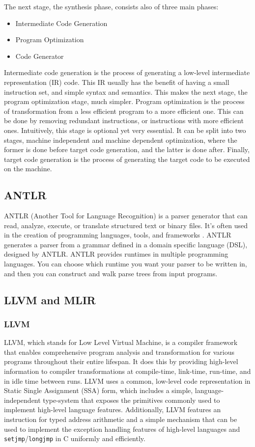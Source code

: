 The next stage, the synthesis phase, consists also of three main phases:
\begin{itemize}
  \item Intermediate Code Generation
  \item Program Optimization
  \item Code Generator
\end{itemize}
Intermediate code generation is the process of generating a low-level
intermediate representation (IR) code. This IR usually has the benefit of having
a small instruction set, and simple syntax and semantics. This makes the next stage, 
the program optimization stage, much simpler.
Program optimization is the process of transformation from a less efficient program 
to a more efficient one. This can be done by removing redundant instructions,
or instructions with more efficient ones. Intuitively, this stage is optional yet
very essential. It can be split into two stages, machine independent and machine
dependent optimization, where the former is done before target code generation,
and the latter is done after.
Finally, target code generation is the process of generating the
target code to be executed on the machine. %
\subsection{ANTLR}
ANTLR (Another Tool for Language Recognition) is a parser generator that can
read, analyze, execute, or translate structured text or binary files. It's often
used in the creation of programming languages, tools, and frameworks
\cite{ANTLR}. ANTLR generates a parser from a grammar defined in a domain
specific language (DSL), designed by ANTLR. ANTLR provides runtimes in multiple
programming languages. You can choose which runtime you want your parser to be
written in, and then you can construct and walk parse trees from input programs.
\subsection{LLVM and MLIR}
\subsubsection{LLVM}
LLVM, which stands for Low Level Virtual Machine, is a compiler framework that
enables comprehensive program analysis and transformation for various programs
throughout their entire lifespan. It does this by providing high-level
information to compiler transformations at compile-time, link-time, run-time,
and in idle time between runs. LLVM uses a common, low-level code representation
in Static Single Assignment (SSA) form, which includes a simple,
language-independent type-system that exposes the primitives commonly used to
implement high-level language features. Additionally, LLVM features an
instruction for typed address arithmetic and a simple mechanism that can be used
to implement the exception handling features of high-level languages and
\texttt{setjmp}/\texttt{longjmp} in C uniformly and efficiently.

